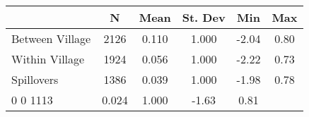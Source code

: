 \begin{tabular}{l*{5}{c}}\hline&\multicolumn{1}{c}{N}&\multicolumn{1}{c}{Mean}&\multicolumn{1}{c}{St. Dev}&\multicolumn{1}{c}{Min}&\multicolumn{1}{c}{Max}\\ \hline 
Between Village & 2126 & 0.110 & 1.000 & -2.04 & 0.80 \\
Within Village & 1924 & 0.056 & 1.000 & -2.22 & 0.73 \\
Spillovers & 1386 & 0.039 & 1.000 & -1.98 & 0.78 \\
0 0 1113 & 0.024 & 1.000 & -1.63 & 0.81 \\
\hline \end{tabular}
